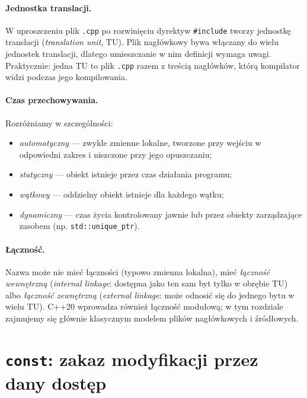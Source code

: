 \paragraph{Jednostka translacji.}
W uproszczeniu plik \texttt{.cpp} po rozwinięciu dyrektyw
\texttt{\#include} tworzy jednostkę translacji
(\emph{translation unit}, TU). Plik nagłówkowy bywa włączany do wielu
jednostek translacji, dlatego umieszczanie w nim definicji wymaga uwagi.
Praktycznie: jedna TU to plik \texttt{.cpp} razem z treścią nagłówków,
którą kompilator widzi podczas jego kompilowania.

\paragraph{Czas przechowywania.}
Rozróżniamy w szczególności:
\begin{itemize}
    \item \emph{automatyczny} --- zwykle zmienne lokalne, tworzone przy
    wejściu w odpowiedni zakres i niszczone przy jego opuszczaniu;
    \item \emph{statyczny} --- obiekt istnieje przez czas działania programu;
    \item \emph{wątkowy} --- oddzielny obiekt istnieje dla każdego wątku;
    \item \emph{dynamiczny} --- czas życia kontrolowany jawnie lub przez
    obiekty zarządzające zasobem (np. \texttt{std::unique\_ptr}).
\end{itemize}

\paragraph{Łączność.}
Nazwa może nie mieć łączności (typowo zmienna lokalna), mieć
\emph{łączność wewnętrzną} (\emph{internal linkage}: dostępna jako ten
sam byt tylko w obrębie TU) albo \emph{łączność zewnętrzną}
(\emph{external linkage}: może odnosić się do jednego bytu w wielu TU).
C++20 wprowadza również łączność modułową; w tym rozdziale zajmujemy się
głównie klasycznym modelem plików nagłówkowych i źródłowych.

\section{\texttt{const}: zakaz modyfikacji przez dany dostęp}

